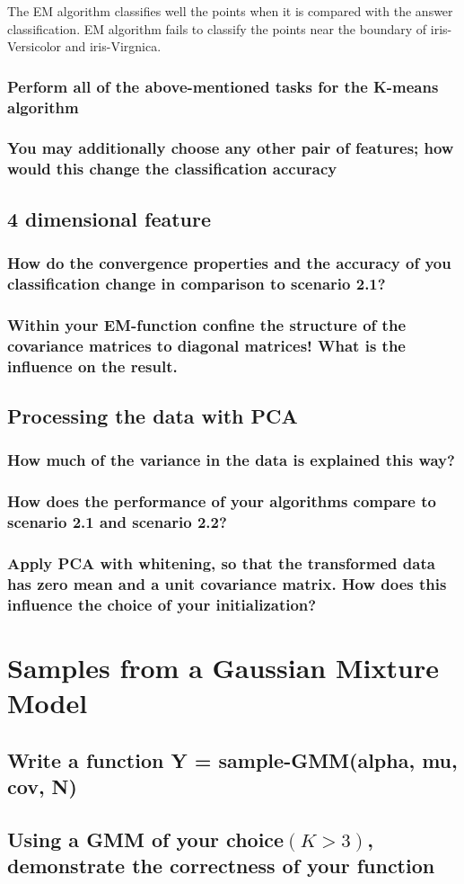 \documentclass[a4paper]{article}
\begin{document}
\begin{itemize}
	The EM algorithm classifies well the points when it is compared with the answer classification. EM algorithm fails to classify the points near the boundary of iris-Versicolor and iris-Virgnica.
	\end{itemize}

	\subsubsection{Perform all of the above-mentioned tasks for the K-means algorithm}
	\subsubsection{You may additionally choose any other pair of features; how would this change the classiﬁcation accuracy}
	
	\subsection{4 dimensional feature}
	\subsubsection{How do the convergence properties and the accuracy of you classiﬁcation change in comparison to scenario 2.1? }
	\subsubsection{Within your EM-function conﬁne the structure of the covariance matrices to diagonal matrices! What is the inﬂuence on the result.}
	\subsection{Processing the data with PCA }
	\subsubsection{How much of the variance in the data is explained this way?}
	\subsubsection{How does the performance of your algorithms compare to scenario 2.1 and scenario 2.2?}
	\subsubsection{Apply PCA with whitening, so that the transformed data has zero mean and a unit covariance matrix. How does this inﬂuence the choice of your initialization?}
	
	\section{Samples from a Gaussian Mixture Model}
	\subsection{Write a function Y = sample-GMM(alpha, mu, cov, N)}
	\subsection{Using a GMM of your choice$ (K > 3)$, demonstrate the correctness of your function}
\end{document}

